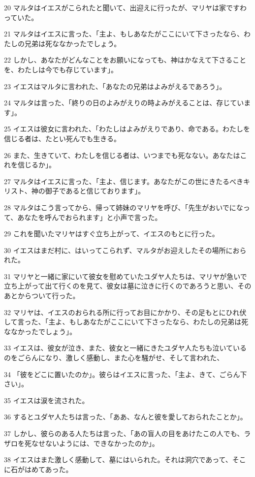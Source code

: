 \par 20 マルタはイエスがこられたと聞いて、出迎えに行ったが、マリヤは家ですわっていた。
\par 21 マルタはイエスに言った、「主よ、もしあなたがここにいて下さったなら、わたしの兄弟は死ななかったでしょう。
\par 22 しかし、あなたがどんなことをお願いになっても、神はかなえて下さることを、わたしは今でも存じています」。
\par 23 イエスはマルタに言われた、「あなたの兄弟はよみがえるであろう」。
\par 24 マルタは言った、「終りの日のよみがえりの時よみがえることは、存じています」。
\par 25 イエスは彼女に言われた、「わたしはよみがえりであり、命である。わたしを信じる者は、たとい死んでも生きる。
\par 26 また、生きていて、わたしを信じる者は、いつまでも死なない。あなたはこれを信じるか」。
\par 27 マルタはイエスに言った、「主よ、信じます。あなたがこの世にきたるべきキリスト、神の御子であると信じております」。
\par 28 マルタはこう言ってから、帰って姉妹のマリヤを呼び、「先生がおいでになって、あなたを呼んでおられます」と小声で言った。
\par 29 これを聞いたマリヤはすぐ立ち上がって、イエスのもとに行った。
\par 30 イエスはまだ村に、はいってこられず、マルタがお迎えしたその場所におられた。
\par 31 マリヤと一緒に家にいて彼女を慰めていたユダヤ人たちは、マリヤが急いで立ち上がって出て行くのを見て、彼女は墓に泣きに行くのであろうと思い、そのあとからついて行った。
\par 32 マリヤは、イエスのおられる所に行ってお目にかかり、その足もとにひれ伏して言った、「主よ、もしあなたがここにいて下さったなら、わたしの兄弟は死ななかったでしょう」。
\par 33 イエスは、彼女が泣き、また、彼女と一緒にきたユダヤ人たちも泣いているのをごらんになり、激しく感動し、また心を騒がせ、そして言われた、
\par 34 「彼をどこに置いたのか」。彼らはイエスに言った、「主よ、きて、ごらん下さい」。
\par 35 イエスは涙を流された。
\par 36 するとユダヤ人たちは言った、「ああ、なんと彼を愛しておられたことか」。
\par 37 しかし、彼らのある人たちは言った、「あの盲人の目をあけたこの人でも、ラザロを死なせないようには、できなかったのか」。
\par 38 イエスはまた激しく感動して、墓にはいられた。それは洞穴であって、そこに石がはめてあった。
